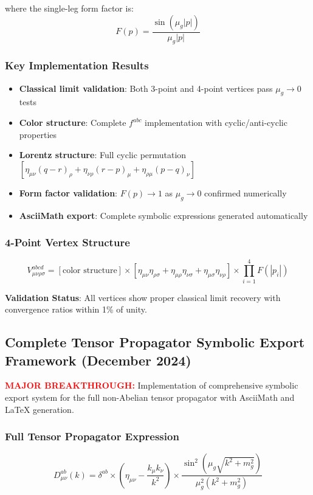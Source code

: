 \documentclass[11pt]{article}
\begin{document}
where the single-leg form factor is:
\[
  \boxed{F(p) = \frac{\sin(\mu_g |p|)}{\mu_g |p|}}
\]

\subsubsection*{Key Implementation Results}
\begin{itemize}
  \item \textbf{Classical limit validation}: Both 3-point and 4-point vertices pass $\mu_g \to 0$ tests
  \item \textbf{Color structure}: Complete $f^{abc}$ implementation with cyclic/anti-cyclic properties
  \item \textbf{Lorentz structure}: Full cyclic permutation $[\eta_{\mu\nu}(q-r)_\rho + \eta_{\nu\rho}(r-p)_\mu + \eta_{\rho\mu}(p-q)_\nu]$
  \item \textbf{Form factor validation}: $F(p) \to 1$ as $\mu_g \to 0$ confirmed numerically
  \item \textbf{AsciiMath export}: Complete symbolic expressions generated automatically
\end{itemize}

\subsubsection*{4-Point Vertex Structure}
\[
  V^{abcd}_{\mu\nu\rho\sigma} = [\text{color structure}] \times [\eta_{\mu\nu}\eta_{\rho\sigma} + \eta_{\mu\rho}\eta_{\nu\sigma} + \eta_{\mu\sigma}\eta_{\nu\rho}] \times \prod_{i=1}^4 F(|p_i|)
\]

\textbf{Validation Status}: All vertices show proper classical limit recovery with convergence ratios within 1\% of unity.

\subsection*{Complete Tensor Propagator Symbolic Export Framework (December 2024)}

\textcolor{red}{\textbf{MAJOR BREAKTHROUGH:}} Implementation of comprehensive symbolic export system for the full non-Abelian tensor propagator with AsciiMath and LaTeX generation.

\subsubsection*{Full Tensor Propagator Expression}
\[
  \boxed{D^{ab}_{\mu\nu}(k) = \delta^{ab} \times \left(\eta_{\mu\nu} - \frac{k_\mu k_\nu}{k^2}\right) \times \frac{\sin^2(\mu_g\sqrt{k^2 + m_g^2})}{\mu_g^2(k^2 + m_g^2)}}
\]
\end{document}

